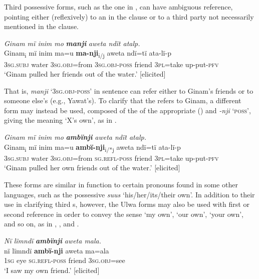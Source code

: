 Third  possessive forms, such as the one in , can have ambiguous reference, pointing either (reflexively) to an  in the clause or to a third party not necessarily mentioned in the clause.

\ea%
    \label{ex:pron:7}
            \textit{Ginam mï inim mo} \textbf{\textit{manji}} \textit{aweta ndït atalp.}\\
\gll    Ginam\textsubscript{i} mï      inim  ma=u      \textbf{ma-nji}\textsubscript{i/j} aweta ndï=tï    ata-lï-p\\
    [name]  \textsc{3sg.subj}  water  \textsc{3sg.obj}=from  \textsc{3sg.obj-poss}  friend \textsc{3pl=}take  up-put-\textsc{pfv}\\

\glt `Ginam pulled her friends out of the water.’ [elicited]
\z

That is, \textit{manji} ‘\textsc{3sg.obj-poss}’ in sentence  can refer either to Ginam’s friends or to someone else’s (e.g., Yawat’s). To clarify that the  refers to Ginam, a different form may instead be used, composed of the   of the appropriate  () and \textit{{}-nji} ‘\textsc{poss}’, giving the meaning ‘X’s own’, as in .

\ea%
    \label{ex:pron:8}
            \textit{Ginam mï inim mo} \textbf{\textit{ambïnji}} \textit{aweta ndït atalp.}\\
\gll    Ginam\textsubscript{i} mï      inim  ma=u      \textbf{ambï-nji}\textsubscript{i/*j}  aweta ndï=tï    ata-lï-p\\
    [name]  \textsc{3sg.subj}  water  \textsc{3sg.obj}=from  \textsc{sg.refl-poss}  friend \textsc{3pl}=take  up-put-\textsc{pfv}\\
\glt `Ginam pulled her own friends out of the water.’ [elicited]
\z

These forms are similar in function to certain pronouns found in some other languages, such as the  possessive   \textit{suus} ‘his/her/its/their own’. In addition to their use in clarifying third  s, however, the Ulwa forms may also be used with first or second  reference in order to convey the sense ‘my own’, ‘our own’, ‘your own’, and so on, as in , , and .

\ea%
    \label{ex:pron:9}
            \textit{Nï lïmndï} \textbf{\textit{ambïnji}} \textit{aweta mala.}\\
\gll    nï    lïmndï  \textbf{ambï-nji}    aweta  ma=ala\\
    1\textsc{sg}  eye    \textsc{sg.refl-poss}  friend  \textsc{3sg.obj=}see\\
\glt `I saw my own friend.’ [elicited]
\z

